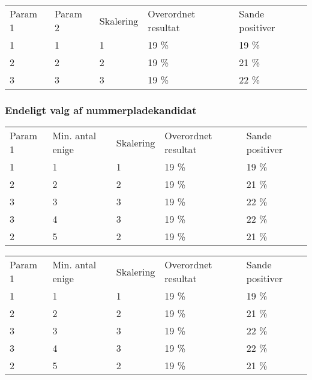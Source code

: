 \begin{tabular}{|l|l|l|l|l|}
\hline
\rowcolor[gray]{0.9} \multicolumn{5}{|>{\columncolor[gray]{0.9}}c|}{\textbf{Kontrolsæt}} \\ \hline
Param 1 & Param 2 & Skalering & Overordnet resultat & Sande positiver\\ \hline
1 & 1 & 1 & 19 \% & 19 \%\\ \hline
2 & 2 & 2 & 19 \% & 21 \% \\ \hline
3 & 3 & 3 & 19 \% & 22 \% \\
\hline
\end{tabular}

\subsubsection*{Endeligt valg af nummerpladekandidat}

\begin{tabular}{|l|l|l|l|l|}
\hline
\rowcolor[gray]{0.9} \multicolumn{5}{|>{\columncolor[gray]{0.9}}c|}{\textbf{Træningssæt}} \\ \hline
Param 1 & Min. antal enige & Skalering & Overordnet resultat & Sande positiver\\ \hline
1 & 1 & 1 & 19 \% & 19 \%\\ \hline
2 & 2 & 2 & 19 \% & 21 \% \\ \hline
3 & 3 & 3 & 19 \% & 22 \% \\ \hline
3 & 4 & 3 & 19 \% & 22 \% \\ \hline
2 & 5 & 2 & 19 \% & 21 \% \\ 
\hline
\end{tabular}

\begin{tabular}{|l|l|l|l|l|}
\hline
\rowcolor[gray]{0.9} \multicolumn{5}{|>{\columncolor[gray]{0.9}}c|}{\textbf{Kontrolsæt}} \\ \hline
Param 1 & Min. antal enige & Skalering & Overordnet resultat & Sande positiver\\ \hline
1 & 1 & 1 & 19 \% & 19 \%\\ \hline
2 & 2 & 2 & 19 \% & 21 \% \\ \hline
3 & 3 & 3 & 19 \% & 22 \% \\ \hline
3 & 4 & 3 & 19 \% & 22 \% \\ \hline
2 & 5 & 2 & 19 \% & 21 \% \\ 
\hline
\end{tabular}





